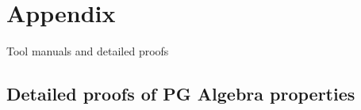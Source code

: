 











\chapter{Appendix}

Tool manuals and detailed proofs



\section{Detailed proofs of PG Algebra properties}

